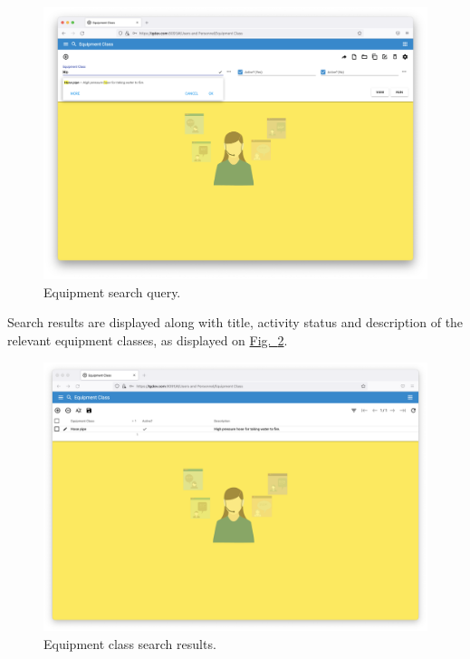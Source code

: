     \begin{figure}[!htbp]
	\centering
	\includegraphics[width=0.95\linewidth]{sections/equipment/images/Fig.2.png}
	\caption{Equipment search query.}\label{sections/equipment/images/Fig.2}
	\end{figure}

\newpage
Search results are displayed along with title, activity status and description of the relevant equipment classes, as displayed on \hyperref[sections/equipment/images/Fig.3]{Fig.~\ref*{sections/equipment/images/Fig.3}}.

    \begin{figure}[!htbp]
	\centering
	\includegraphics[width=0.95\linewidth]{sections/equipment/images/Fig.3.png}
	\caption{Equipment class search results.}\label{sections/equipment/images/Fig.3}
	\end{figure}
	
